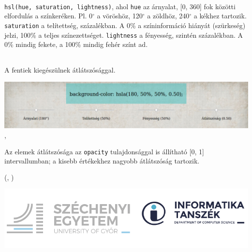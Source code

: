 \begin{frame}
  \begin{description}[m]
    \item[\texttt{hsl()} függvénnyel] \hfill \\ \texttt{hsl(hue, 
    saturation, lightness)}, ahol \texttt{hue} az árnyalat, [0, 360] 
    fok közötti elfordulás a színkeréken. Pl. 0$^{\circ}$ a 
    vöröshöz, 120$^{\circ}$ a zöldhöz, 240$^{\circ}$ a kékhez 
    tartozik. \texttt{saturation} a telítettség, százalékban. A 0\% 
    a színinformáció hiányát (szürkeség) jelzi, 100\% a teljes 
    színezettséget. \texttt{lightness} a fényesség, szintén 
    százalékban. A 0\% mindig fekete, a 100\% mindig fehér színt ad.
    \item[\texttt{hsla()} függvénnyel] \hfill \\ A fentiek 
    kiegészülnek átlátszósággal.
  \end{description}
  \vfill
  \begin{center}
    \includegraphics[scale=0.2]{szinek2.png}\\
    , 
  \end{center}
\end{frame}

\begin{frame}
  Az elemek átlátszósága az \texttt{opacity} tulajdonsággal is állítható [0, 1] intervallumban; a kisebb értékekhez nagyobb átlátszóság tartozik.
  \begin{exampleblock}{ (, )}
    \scriptsize
    
    
  \end{exampleblock}
  \begin{center}
    \includegraphics[width=.5\textwidth]{atlatszosag1.png}
  \end{center}
\end{frame}

